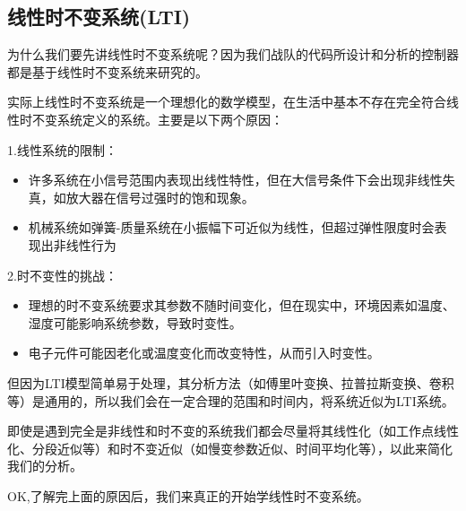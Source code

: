 \documentclass[UTF8,a4paper,12pt]{ctexart}
\begin{document}
  \subsection{线性时不变系统(LTI)}
    \begin{flushleft}
      为什么我们要先讲线性时不变系统呢？因为我们战队的代码所设计和分析的控制器都是基于线性时不变系统来研究的。
      \par 实际上线性时不变系统是一个理想化的数学模型，在生活中基本不存在完全符合线性时不变系统定义的系统。主要是以下两个原因：
      \begin{notitlebox}
          \par1.线性系统的限制：
          \begin{itemize} 
            \item 许多系统在小信号范围内表现出线性特性，但在大信号条件下会出现非线性失真，如放大器在信号过强时的饱和现象。
            \item 机械系统如弹簧-质量系统在小振幅下可近似为线性，但超过弹性限度时会表现出非线性行为
          \end{itemize}

          \par2.时不变性的挑战：
          \begin{itemize} 
          \item 理想的时不变系统要求其参数不随时间变化，但在现实中，环境因素如温度、湿度可能影响系统参数，导致时变性。
          \item 电子元件可能因老化或温度变化而改变特性，从而引入时变性。  
          \end{itemize}
          \begin{flushleft}
           但因为LTI模型简单易于处理，其分析方法（如傅里叶变换、拉普拉斯变换、卷积等）是通用的，所以我们会在一定合理的范围和时间内，将系统近似为LTI系统。\par 即使是遇到完全是非线性和时不变的系统我们都会尽量将其线性化（如工作点线性化、分段近似等）和时不变近似（如慢变参数近似、时间平均化等），以此来简化我们的分析。
          \end{flushleft}
      \end{notitlebox}
    \end{flushleft}
    \begin{flushleft}
      OK,了解完上面的原因后，我们来真正的开始学线性时不变系统。
    \end{flushleft}
\end{document}

